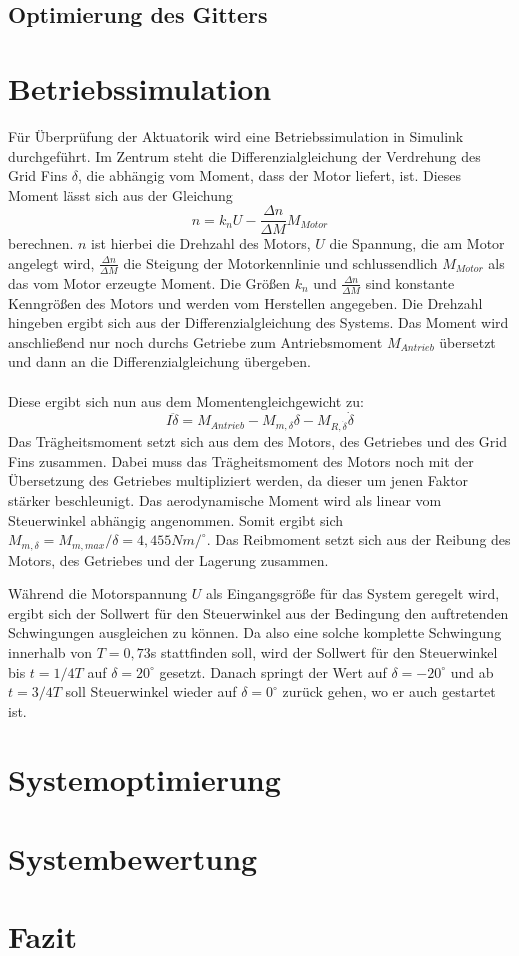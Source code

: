 \subsection{Optimierung des Gitters}
\section{Betriebssimulation}
Für Überprüfung der Aktuatorik wird eine Betriebssimulation in Simulink durchgeführt.
Im Zentrum steht die Differenzialgleichung der Verdrehung des Grid Fins $\delta$, die abhängig vom Moment, dass der Motor liefert, ist. Dieses Moment lässt sich aus der Gleichung
\begin{equation}
	n =k_nU-\frac{\Delta n}{\Delta M}M_{Motor}
\end{equation}
berechnen. $n$ ist hierbei die Drehzahl des Motors, $U$ die Spannung, die am Motor angelegt wird, $\frac{\Delta n}{\Delta M}$ die Steigung der Motorkennlinie und schlussendlich $M_{Motor}$ als das vom Motor erzeugte Moment. Die Größen $k_n$ und $\frac{\Delta n}{\Delta M}$ sind konstante Kenngrößen des Motors und werden vom Herstellen angegeben. Die Drehzahl hingeben ergibt sich aus der Differenzialgleichung des Systems. Das Moment wird anschließend nur noch durchs Getriebe zum Antriebsmoment $M_{Antrieb}$ übersetzt und dann an die Differenzialgleichung übergeben.
\\~\\
Diese ergibt sich nun aus dem Momentengleichgewicht zu:
\begin{equation}
	I\ddot{\delta} = M_{Antrieb} - M_{m, \delta}\delta - M_{R, \dot{\delta}}\dot{\delta}
\end{equation}
Das Trägheitsmoment setzt sich aus dem des Motors, des Getriebes und des Grid Fins zusammen. Dabei muss das Trägheitsmoment des Motors noch mit der Übersetzung des Getriebes multipliziert werden, da dieser um jenen Faktor stärker beschleunigt. Das aerodynamische Moment wird als linear vom Steuerwinkel abhängig angenommen. Somit ergibt sich $M_{m, \delta} = M_{m, max}/\delta = 4,455Nm/^\circ$. Das Reibmoment setzt sich aus der Reibung des Motors, des Getriebes und der Lagerung zusammen.

Während die Motorspannung $U$ als Eingangsgröße für das System geregelt wird, ergibt sich der Sollwert für den Steuerwinkel aus der Bedingung den auftretenden Schwingungen ausgleichen zu können. Da also eine solche komplette Schwingung innerhalb von $T = 0,73$s stattfinden soll, wird der Sollwert für den Steuerwinkel bis $t = 1/4T$ auf $\delta = 20^\circ$ gesetzt. Danach springt der Wert auf $\delta = -20^\circ$ und ab $t = 3/4T$ soll Steuerwinkel wieder auf $\delta = 0^\circ$ zurück gehen, wo er auch gestartet ist.
\section{Systemoptimierung}

\section{Systembewertung}

\section{Fazit}